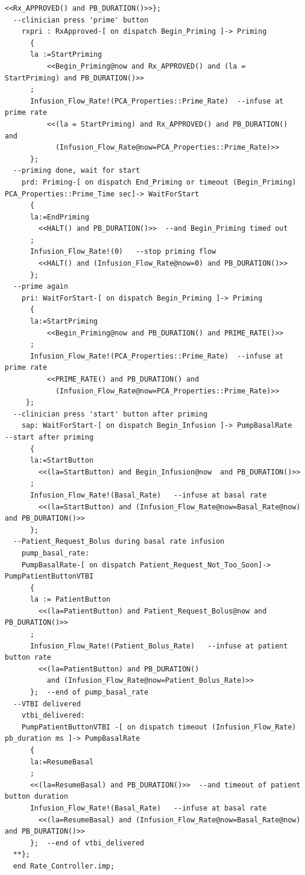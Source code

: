 \begin{lstlisting}[language=aadl, frame=single, gobble=0, caption={\lstinline{Rate_Controller} thread from \lstinline{PCA_Operation} component with BLESS assertions}, label={listing:rate_controller}]
      <<Rx_APPROVED() and PB_DURATION()>>};  
  --clinician press 'prime' button
    rxpri : RxApproved-[ on dispatch Begin_Priming ]-> Priming  
      {
      la :=StartPriming
          <<Begin_Priming@now and Rx_APPROVED() and (la = StartPriming) and PB_DURATION()>>
      ; 
      Infusion_Flow_Rate!(PCA_Properties::Prime_Rate)  --infuse at prime rate
          <<(la = StartPriming) and Rx_APPROVED() and PB_DURATION() and
            (Infusion_Flow_Rate@now=PCA_Properties::Prime_Rate)>>   
      };
  --priming done, wait for start
    prd: Priming-[ on dispatch End_Priming or timeout (Begin_Priming) PCA_Properties::Prime_Time sec]-> WaitForStart  
      {
      la:=EndPriming
        <<HALT() and PB_DURATION()>>  --and Begin_Priming timed out
      ;
      Infusion_Flow_Rate!(0)   --stop priming flow
        <<HALT() and (Infusion_Flow_Rate@now=0) and PB_DURATION()>>
      };
  --prime again
    pri: WaitForStart-[ on dispatch Begin_Priming ]-> Priming  
      {
      la:=StartPriming
          <<Begin_Priming@now and PB_DURATION() and PRIME_RATE()>>
      ; 
      Infusion_Flow_Rate!(PCA_Properties::Prime_Rate)  --infuse at prime rate
          <<PRIME_RATE() and PB_DURATION() and
            (Infusion_Flow_Rate@now=PCA_Properties::Prime_Rate)>>   
     };
  --clinician press 'start' button after priming    
    sap: WaitForStart-[ on dispatch Begin_Infusion ]-> PumpBasalRate  --start after priming
      {
      la:=StartButton
        <<(la=StartButton) and Begin_Infusion@now  and PB_DURATION()>>    
      ;
      Infusion_Flow_Rate!(Basal_Rate)   --infuse at basal rate
        <<(la=StartButton) and (Infusion_Flow_Rate@now=Basal_Rate@now) and PB_DURATION()>>
      };
  --Patient_Request_Bolus during basal rate infusion
    pump_basal_rate: 
    PumpBasalRate-[ on dispatch Patient_Request_Not_Too_Soon]-> PumpPatientButtonVTBI
      {
      la := PatientButton 
        <<(la=PatientButton) and Patient_Request_Bolus@now and PB_DURATION()>>    
      ;
      Infusion_Flow_Rate!(Patient_Bolus_Rate)   --infuse at patient button rate
        <<(la=PatientButton) and PB_DURATION()
          and (Infusion_Flow_Rate@now=Patient_Bolus_Rate)>>     
      };  --end of pump_basal_rate
  --VTBI delivered
    vtbi_delivered: 
    PumpPatientButtonVTBI -[ on dispatch timeout (Infusion_Flow_Rate) pb_duration ms ]-> PumpBasalRate
      {
      la:=ResumeBasal
      ;
      <<(la=ResumeBasal) and PB_DURATION()>>  --and timeout of patient button duration
      Infusion_Flow_Rate!(Basal_Rate)   --infuse at basal rate
        <<(la=ResumeBasal) and (Infusion_Flow_Rate@now=Basal_Rate@now) and PB_DURATION()>>   
      };  --end of vtbi_delivered
  **};
  end Rate_Controller.imp;
\end{lstlisting} 
\doublespacing

